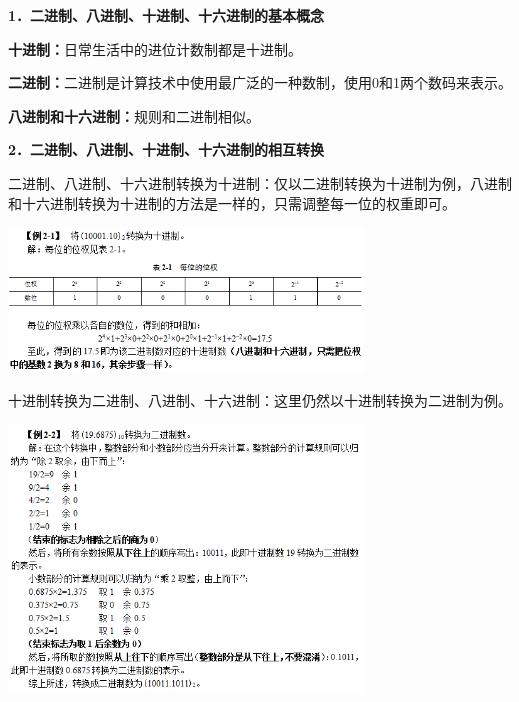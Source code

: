 \textbf{{1．二进制、八进制、十进制、十六进制的基本概念}}

\textbf{十进制：}日常生活中的进位计数制都是十进制。

\textbf{二进制：}二进制是计算技术中使用最广泛的一种数制，使用0和1两个数码来表示。

\textbf{八进制和十六进制：}规则和二进制相似。

\textbf{{2．二进制、八进制、十进制、十六进制的相互转换}}

二进制、八进制、十六进制转换为十进制：仅以二进制转换为十进制为例，八进制和十六进制转换为十进制的方法是一样的，只需调整每一位的权重即可。

\includegraphics[width=3.70833in,height=1.51042in]{png-jpeg-pics/7EDEFAD7FA51962C5B15F65354D73BB4.png}

十进制转换为二进制、八进制、十六进制：这里仍然以十进制转换为二进制为例。

\includegraphics[width=3.70833in,height=2.81250in]{png-jpeg-pics/E6B48075C7E26FC3D268151E18A67A21.png}
